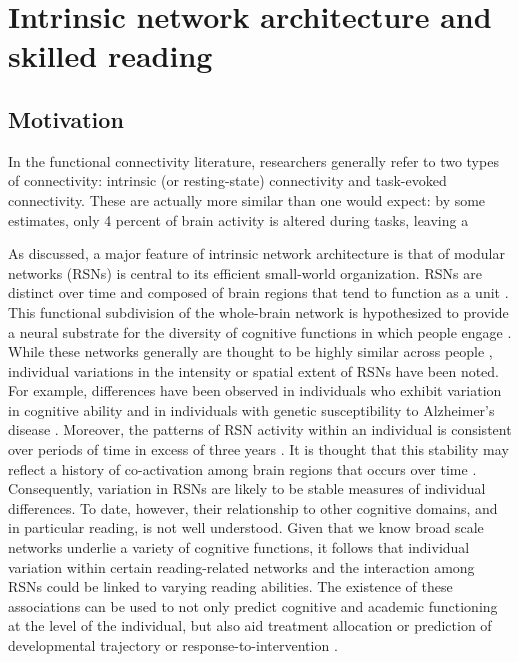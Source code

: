 \chapter{Intrinsic network architecture and skilled reading}

\section{Motivation}

In the functional connectivity literature, researchers generally refer to two types of connectivity: intrinsic (or resting-state) connectivity and task-evoked connectivity. These are actually more similar than one would expect: by some estimates, only 4 percent of brain activity is altered during tasks, leaving a 

% 
As discussed, a major feature of intrinsic network architecture is that of modular networks (RSNs) is central to its efficient small-world organization. RSNs are distinct over time and composed of brain regions that tend to function as a unit \citep{DeLuca2006, Smith2009, Yeo2011}. This functional subdivision of the whole-brain network is hypothesized to provide a neural substrate for the diversity of cognitive functions in which people engage \citep{Yeo2014}. While these networks generally are thought to be highly similar across people \citep{Damoiseaux2006}, individual variations in the intensity or spatial extent of RSNs have been noted. For example, differences have been observed in individuals who exhibit variation in cognitive ability \citep{Reineberg2015, Tian2013} and in individuals with genetic susceptibility to Alzheimer’s disease \citep{Filippini2009}. Moreover, the patterns of RSN activity within an individual is consistent over periods of time in excess of three years \citep{Choe2015}. It is thought that this stability may reflect a history of co-activation among brain regions that occurs over time \citep{Power2010}. Consequently, variation in RSNs are likely to be stable measures of individual differences. To date, however, their relationship to other cognitive domains, and in particular reading, is not well understood.  Given that we know broad scale networks underlie a variety of cognitive functions, it follows that individual variation within certain reading-related networks and the interaction among RSNs could be linked to varying reading abilities. The existence of these associations can be used to not only predict cognitive and academic functioning at the level of the individual, but also aid treatment allocation or prediction of developmental trajectory \citep{Mattfeld2014} or response-to-intervention \citep{Crowther2015, Whitfield-Gabrieli2015}. 

